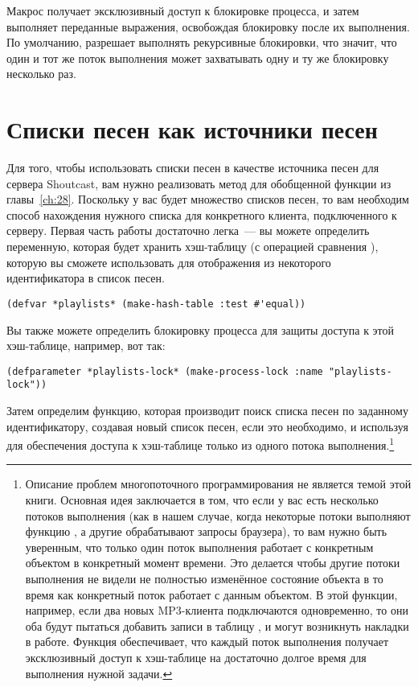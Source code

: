 Макрос  получает эксклюзивный доступ к блокировке процесса, и
затем выполняет переданные выражения, освобождая блокировку после их выполнения.  По
умолчанию,  разрешает выполнять рекурсивные блокировки, что
значит, что один и тот же поток выполнения может захватывать одну и ту же блокировку
несколько раз.

\section{Списки песен как источники песен}

Для того, чтобы использовать списки песен в качестве источника песен для сервера
Shoutcast, вам нужно реализовать метод для обобщенной функции  из
главы~\ref{ch:28}.  Поскольку у вас будет множество списков песен, то вам необходим способ
нахождения нужного списка для конкретного клиента, подключенного к серверу.  Первая часть
работы достаточно легка~--- вы можете определить переменную, которая будет хранить
хэш-таблицу (с операцией сравнения ), которую вы сможете использовать для
отображения из некоторого идентификатора в список песен.

\begin{lstlisting}
(defvar *playlists* (make-hash-table :test #'equal))
\end{lstlisting}

Вы также можете определить блокировку процесса для защиты доступа к этой хэш-таблице,
например, вот так:

\begin{lstlisting}
(defparameter *playlists-lock* (make-process-lock :name "playlists-lock"))
\end{lstlisting}

Затем определим функцию, которая производит поиск списка песен по заданному
идентификатору, создавая новый список песен, если это необходимо, и используя
 для обеспечения доступа к хэш-таблице только из одного потока
выполнения.\footnote{Описание проблем многопоточного программирования не является темой
  этой книги. Основная идея заключается в том, что если у вас есть несколько потоков
  выполнения (как в нашем случае, когда некоторые потоки выполняют функцию
  , а другие обрабатывают запросы браузера), то вам нужно быть уверенным,
  что только один поток выполнения работает с конкретным объектом в конкретный момент
  времени.  Это делается чтобы другие потоки выполнения не видели не полностью изменённое
  состояние объекта в то время как конкретный поток работает с данным объектом.  В этой
  функции, например, если два новых MP3-клиента подключаются одновременно, то они оба
  будут пытаться добавить записи в таблицу , и могут возникнуть накладки
  в работе.  Функция  обеспечивает, что каждый поток выполнения
  получает эксклюзивный доступ к хэш-таблице на достаточно долгое время для выполнения
  нужной задачи.}

